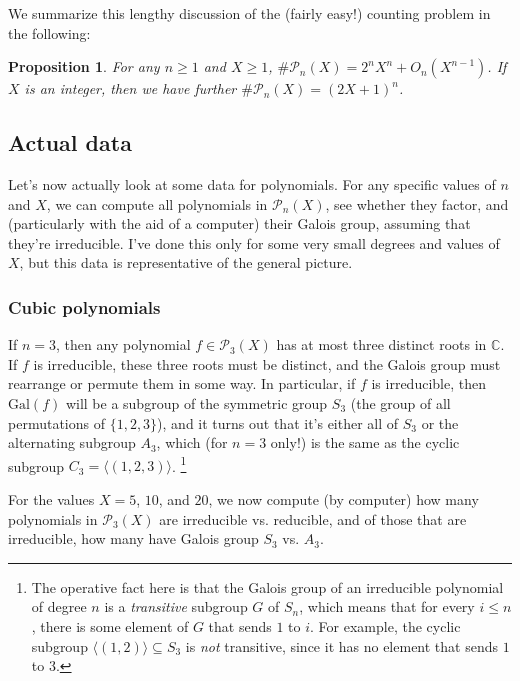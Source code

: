 \documentclass[12pt]{amsart}
\newtheorem{proposition}[theorem]{Proposition}
\theoremstyle{definition} \newtheorem*{notation}{Notation}
\theoremstyle{remark} \newtheorem*{remark}{Remark}
\numberwithin{equation}{section}
\numberwithin{theorem}{section}
\begin{document}
	We summarize this lengthy discussion of the (fairly easy!) counting problem in the following:
	
	\begin{proposition}
		For any $n \geq 1$ and $X \geq 1$, $\#\mathcal{P}_n(X) = 2^n X^n + O_n(X^{n-1})$.  If $X$ is an integer, then we have further $\#\mathcal{P}_n(X) = (2X+1)^n$.
	\end{proposition}
	
	\subsection{Actual data}
	
	Let's now actually look at some data for polynomials.  For any specific values of $n$ and $X$, we can compute all polynomials in $\mathcal{P}_n(X)$, see whether they factor, and (particularly with the aid of a computer) their Galois group, assuming that they're irreducible.  I've done this only for some very small degrees and values of $X$, but this data is representative of the general picture.
	
	\subsubsection{Cubic polynomials}  If $n=3$, then any polynomial $f \in \mathcal{P}_3(X)$ has at most three distinct roots in $\mathbb{C}$.  If $f$ is irreducible, these three roots must be distinct, and the Galois group must rearrange or permute them in some way.  In particular, if $f$ is irreducible, then $\mathrm{Gal}(f)$ will be a subgroup of the symmetric group $S_3$ (the group of all permutations of $\{1,2,3\}$), and it turns out that it's either all of $S_3$ or the alternating subgroup $A_3$, which (for $n=3$ only!) is the same as the cyclic subgroup $C_3 = \langle (1,2,3) \rangle$. \footnote{The operative fact here is that the Galois group of an irreducible polynomial of degree $n$ is a \emph{transitive} subgroup $G$ of $S_n$, which means that for every $i \leq n$, there is some element of $G$ that sends $1$ to $i$.  For example, the cyclic subgroup $\langle (1,2) \rangle \subseteq S_3$ is \emph{not} transitive, since it has no element that sends $1$ to $3$.}
	
	For the values $X=5$, $10$, and $20$, we now compute (by computer) how many polynomials in $\mathcal{P}_3(X)$ are irreducible vs. reducible, and of those that are irreducible, how many have Galois group $S_3$ vs. $A_3$.
	
\end{document}
